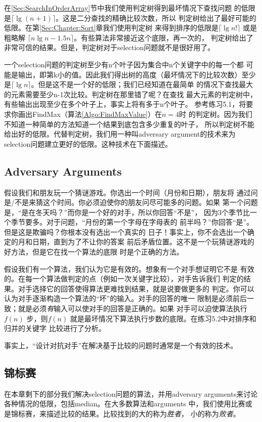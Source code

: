 在\ref{Sec:SearchInOrderArray}节中我们使用判定树得到最坏情况下查找问题
的低限是$\lceil \lg(n+1)\rceil$。这是二分查找的精确比较次数，所以
判定树给出了最好可能的低限。在第\ref{Sec:Chapter:Sort}章我们使用判定树
来得到排序的低限是$\lceil \lg n!\rceil$ 或是粗略解
$\lceil n\lg n -1.5n\rceil$。有些算法非常接近这个底限，再一次的，
判定树给出了非常可信的结果。但是，判定树对于selection问题就不是很好用了。

一个selection问题的判定树至少有n个叶子因为集合中n个关键字中的每一个都
可能是输出，即第k小的值。因此我们得出树的高度（最坏情况下的比较次数）至少
是$\lceil \lg n\rceil$。但是这不是一个好的低限；我们已经知道在最简单
的情况下查找最大的元素需要至少n-1次比较。判定树在那里错了呢？在查找
最大元素的判定树中，有些输出出现至少在多个叶子上，事实上将有多于n个叶子。
参考练习5.1，将要求你画出FindMax（算法\ref{Algo:FindMaxValue}）在$n=4$时
的判定树。因为我们不知道一种简单的方法知道一个结果到底包含多少重复的叶子，
所以判定树不能给出好的低限。代替判定树，我们用一种叫adversary
argument的技术来为selection问题建立更好的低限。这种技术在下面描述。

\subsection{Adversary Arguments}
假设我们和朋友玩一个猜谜游戏。你选出一个时间（月份和日期），朋友将
通过问是/不是来猜这个时间。你必须迫使你的朋友问尽可能多的问题。如果
第一个问题是，“是在冬天吗？”而你是一个好的对手，所以你回答“不是”，
因为3个季节比一个季节要多。对于问题，“月份的第一个字母在字母表的
前半吗？”你回答“是”。但是这是欺骗吗？你根本没有选出一个真实的
日子！事实上，你不会选出一个确定的月和日期，直到为了不让你的答案
前后矛盾位置。这不是一个玩猜谜游戏的好方法，但是它在找一个算法的底限
时是个正确的方法。

假设我们有一个算法，我们认为它是有效的。想象有一个对手想证明它不是
有效的。在每一个算法做判定的点（例如一次关键字比较），对手告诉我们
判定的结果。对手选择它的回答使得算法更难找到结果，就是说要做更多的
判定。你可以认为对手逐渐构造一个算法的“坏”的输入。对手的回答的唯一
限制是必须前后一致；就是必须\emph{有}输入可以使对手的回答是正确的。如果
对手可以迫使算法执行$f(n)$ 步，则$f(n)$
就是最坏情况下算法执行步数的底限。在练习5.2中对排序和归并的关键字
比较进行了分析。

事实上，“设计对抗对手”在解决基于比较的问题时通常是一个有效的技术。

\subsection{锦标赛}
在本章剩下的部分我们解决selection问题的算法，并用adversary
arguments来讨论各种情况的低限，包括median。在大多数算法和arguments
中，我们使用比赛或是锦标赛，来描述比较的结果。比较找到的大的称为\emph{胜者}，
小的称为\emph{败者}。

